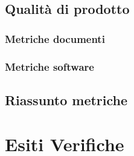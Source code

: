 \documentclass[a4paper, oneside, openany, dvipsnames, table]{article}
\begin{document}
	\subsection{Qualità di prodotto}
	
		\subsubsection{Metriche documenti}
		
		\subsubsection{Metriche software}
		
	\subsection{Riassunto metriche}
	
		
% 	
% 		
% 			
% 			


\appendix
{}

\newpage
\section{Esiti Verifiche}

\end{document}
